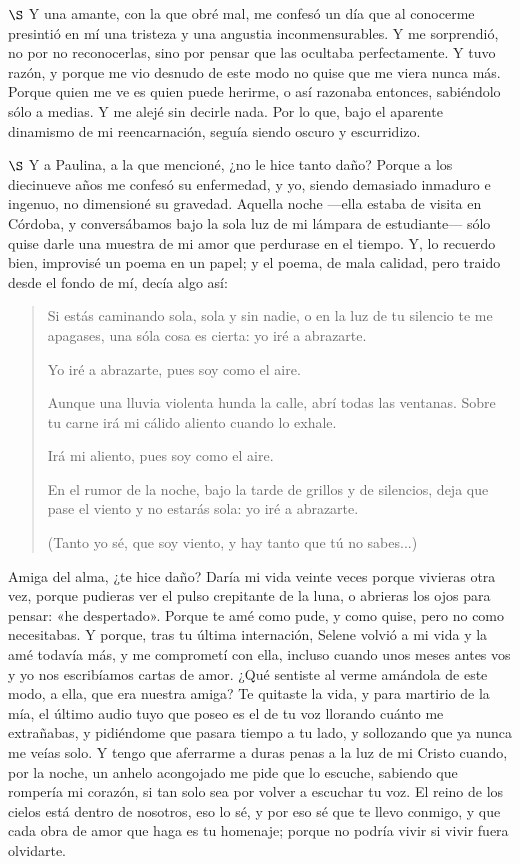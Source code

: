 \documentclass[a4paper, 12pt]{article}
\begin{document}
$\S$ Y una amante, con la que obré mal, me confesó un día que al conocerme
presintió en mí una tristeza y una angustia inconmensurables. Y me sorprendió,
no por no reconocerlas, sino por pensar que las ocultaba perfectamente. Y tuvo
razón, y porque me vio desnudo de este modo no quise que me viera nunca más.
Porque quien me ve es quien puede herirme, o así razonaba entonces, sabiéndolo
sólo a medias. Y me alejé sin decirle nada. Por lo que, bajo el aparente
dinamismo de mi reencarnación, seguía siendo oscuro y escurridizo.

$\S$ Y a Paulina, a la que mencioné, ¿no le hice tanto daño? Porque a los
diecinueve años me confesó su enfermedad, y yo, siendo demasiado inmaduro e
ingenuo, no dimensioné su gravedad. Aquella noche ---ella estaba de visita en
Córdoba, y conversábamos bajo la sola luz de mi lámpara de estudiante--- sólo
quise darle una muestra de mi amor que perdurase en el tiempo. Y, lo recuerdo
bien, improvisé un poema en un papel; y el poema, de mala calidad, pero traido
desde el fondo de mí, decía algo así:

\begin{verse}
Si estás caminando sola,
sola y sin nadie,
o en la luz de tu silencio
te me apagases,
una sóla cosa es cierta:
yo iré a abrazarte.


Yo iré a abrazarte,
pues soy como el aire.

Aunque una lluvia violenta
hunda la calle,
abrí todas las ventanas.
Sobre tu carne
irá mi cálido aliento
cuando lo exhale.

Irá mi aliento,
pues soy como el aire.

En el rumor de la noche,
bajo la tarde 
de grillos y de silencios,
deja que pase 
el viento y no estarás sola:
yo iré a abrazarte.

(Tanto yo sé, que soy viento,
y hay tanto que tú no sabes...)
\end{verse}

Amiga del alma, ¿te hice daño? Daría mi vida veinte veces porque vivieras otra
vez, porque pudieras ver el pulso crepitante de la luna, o abrieras los ojos
para pensar: «he despertado». Porque te amé como pude, y como quise, pero no
como necesitabas. Y porque, tras tu última internación, Selene volvió a mi vida
y la amé todavía más, y me comprometí con ella, incluso cuando unos meses antes
vos y yo nos escribíamos cartas de amor. ¿Qué sentiste al verme amándola de este
modo, a ella, que era nuestra amiga? Te quitaste la vida, y para martirio de la
mía, el último audio tuyo que poseo es el de tu voz llorando cuánto me
extrañabas, y pidiéndome que pasara tiempo a tu lado, y sollozando que ya nunca
me veías solo. Y tengo que aferrarme a duras penas a la luz de mi Cristo cuando,
por la noche, un anhelo acongojado me pide que lo escuche, sabiendo que rompería
mi corazón, si tan solo sea por volver a escuchar tu voz. El reino de los cielos
está dentro de nosotros, eso lo sé, y por eso sé que te llevo conmigo, y que
cada obra de amor que haga es tu homenaje; porque no podría vivir si vivir fuera
olvidarte.
\end{document}
